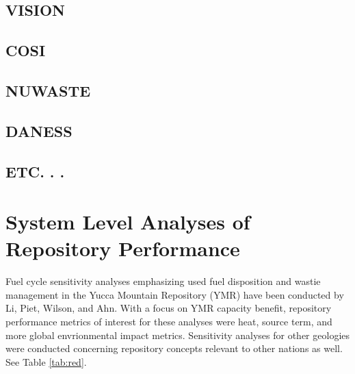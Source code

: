 \subsection{VISION}

\subsection{COSI}

\subsection{NUWASTE}

\subsection{DANESS}

\subsection{ETC. . . }




\section{System Level Analyses of Repository Performance} 

Fuel cycle sensitivity analyses emphasizing used fuel disposition and 
wastie management in the Yucca Mountain Repository (YMR) have been 
conducted by Li, Piet, Wilson, and Ahn. With a focus on YMR capacity 
benefit, repository performance metrics of interest for these analyses 
were heat, source term, and more global envrionmental impact metrics. 
Sensitivity analyses for other geologies were conducted concerning 
repository concepts relevant to other nations as well. See Table 
\ref{tab:red}.









